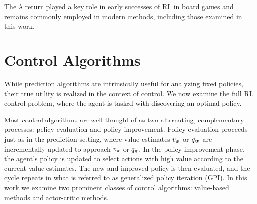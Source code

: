 The $\lambda$ return played a key role in early successes of RL in board games  and remains commonly employed in modern methods, including those examined in this work.


\section{Control Algorithms}
While prediction algorithms are intrinsically useful for analyzing fixed policies, their true utility is realized in the context of control. We now examine the full RL control problem, where the agent is tasked with discovering an optimal policy. 

Most control algorithms are well thought of as two alternating, complementary processes: policy evaluation and policy improvement. Policy evaluation proceeds just as in the prediction setting, where value estimates $v_{\bm \phi}$ or $q_{\bm w}$ are incrementally updated to approach $v_{\pi}$ or $q_{\pi}$. In the policy improvement phase, the agent's policy is updated to select actions with high value according to the current value estimates. The new and improved policy is then evaluated, and the cycle repeats in what is referred to as generalized policy iteration (GPI). %
In this work we examine two prominent classes of control algorithms: value-based methods and actor-critic methods. 

